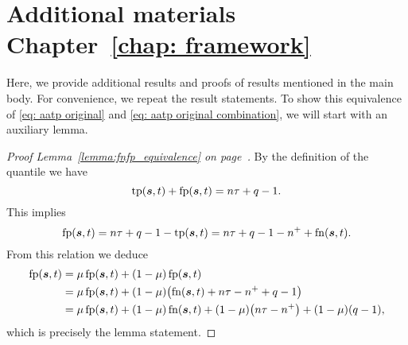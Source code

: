 \chapter{Additional materials Chapter~\ref{chap: framework}}

Here, we provide additional results and proofs of results mentioned in the main body. For convenience, we repeat the result statements. To show this equivalence of \eqref{eq: aatp original} and \eqref{eq: aatp original combination}, we will start with an auxiliary lemma.

\lemmaequivalence*
\begin{proof}[Proof Lemma~\ref{lemma:fnfp_equivalence} on page~\pageref{lemma:fnfp_equivalence}]
  By the definition of the quantile we have
  \begin{equation*}
    \operatorname{tp}(\bm{s},t)+\operatorname{fp}(\bm{s},t) = n\tau + q-1.
  \end{equation*}
  This implies
  \begin{equation*}
    \operatorname{fp}(\bm{s},t)=n\tau +q - 1-\operatorname{tp}(\bm{s},t) =n\tau+q-1-n^{+} +\operatorname{fn}(\bm{s},t).
  \end{equation*}
  From this relation we deduce
  \begin{equation*}
    \begin{aligned}
      \fp(\bm{s},t)
      & = \mu \fp(\bm{s},t) + (1 - \mu)\fp(\bm{s},t) \\
      & = \mu \fp(\bm{s},t) + (1 - \mu)\Brac{\fn(\bm{s},t) + n\tau - n^+ + q - 1} \\
      & = \mu \fp(\bm{s},t) + (1 - \mu)\fn(\bm{s},t) + (1-\mu)\Brac{n\tau - n^+} + (1-\mu)\Brac{q - 1},
    \end{aligned}
  \end{equation*}
  which is precisely the lemma statement.
\end{proof}

